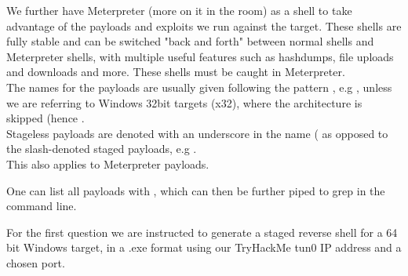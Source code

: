 {We further have Meterpreter (more on it in the  room) as a shell to take advantage of the payloads and exploits we run against the target. These shells are fully stable and can be switched "back and forth" between normal shells and Meterpreter shells, with multiple useful features such as hashdumps, file uploads and downloads and more. These shells must be caught in Meterpreter.\\

The names for the payloads are usually given following the pattern , e.g , unless we are referring to Windows 32bit targets (x32), where the architecture is skipped (hence .\\
Stageless payloads are denoted with an underscore in the name ( as opposed to the slash-denoted staged payloads, e.g .\\
This also applies to Meterpreter payloads.

One can list all payloads with , which can then be further piped to grep in the command line.

For the first question we are instructed to generate a staged reverse shell for a 64 bit Windows target, in a .exe format using our TryHackMe tun0 IP address and a chosen port.\\
}
%
